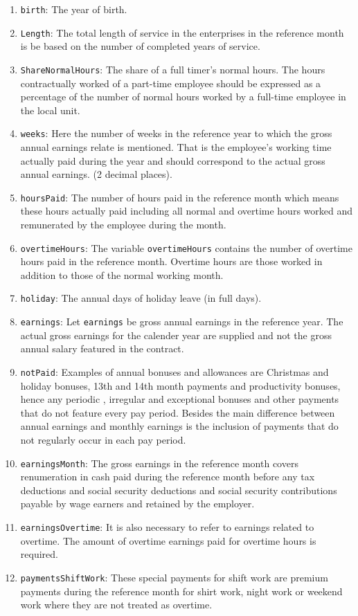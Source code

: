 \documentclass[12pt]{article}
\begin{document}
\begin{enumerate}
\item \texttt{birth}: The year of birth. 
\item  \texttt{Length}: The total length of service in the enterprises in the reference month is be based on the number of completed years of service. 
\item  \texttt{ShareNormalHours}: The share of a full timer's normal hours. The hours contractually worked of a part-time employee should be expressed as a percentage of the number of  normal hours worked by a full-time employee in the local unit. 
\item \texttt{weeks}: Here the number of weeks in the reference year to which the gross annual earnings relate is mentioned. That is the employee's working time actually paid during the year and should correspond to the actual gross annual earnings. (2 decimal places).  
\item \texttt{hoursPaid}: The number of hours paid in the reference month which means these hours actually paid including all normal and overtime hours worked and remunerated by the employee during the month. 
\item \texttt{overtimeHours}: The variable \texttt{overtimeHours} contains the number of overtime hours paid in the reference month. Overtime hours are those worked in addition to those of the normal working month.
\item \texttt{holiday}: The annual days of holiday leave (in full days). 
\item \texttt{earnings}: Let \texttt{earnings} be gross annual earnings in the reference year. The actual gross earnings for the calender year are supplied and not the gross annual salary featured in the contract. 
\item \texttt{notPaid}: Examples of annual bonuses and allowances
 are Christmas and holiday bonuses, 13th and 14th month payments and productivity bonuses, hence any periodic , irregular and exceptional bonuses and other payments that do not feature every pay period. Besides the main difference between annual earnings and monthly earnings is the inclusion of payments that do not regularly occur in each pay period.
\item \texttt{earningsMonth}: The gross earnings in the reference month covers renumeration in cash paid during the reference month before any tax deductions and social security deductions and social security contributions payable by wage earners and retained by the employer. 
\item \texttt{earningsOvertime}: It  is also necessary to refer to earnings related to overtime. The amount of overtime earnings paid for overtime hours is required.  
\item \texttt{paymentsShiftWork}: These special payments for shift work are premium payments during the reference month for shirt work, night work or weekend work where they are not treated as overtime.   
\end{enumerate}
\end{document}
